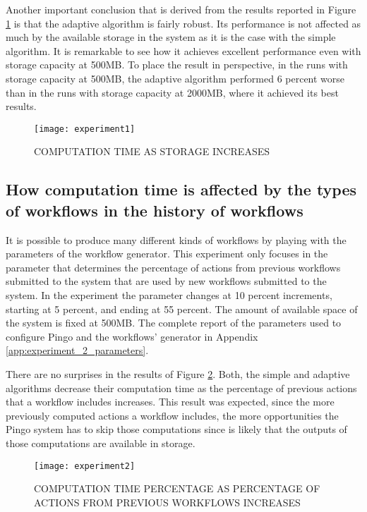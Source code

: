 Another important conclusion that is derived from the results reported in Figure \ref{fig:experiment1} is that the adaptive algorithm is fairly robust. Its performance is not affected as much by the available storage in the system as it is the case with the simple algorithm. It is remarkable to see how it achieves excellent performance even with storage capacity at 500MB.  To place the result in perspective, in the runs with storage capacity at 500MB, the adaptive algorithm performed 6 percent worse than in the runs with storage capacity at 2000MB, where it achieved its best results.


\begin{figure}
\centering
\texttt{[image: experiment1]}
\caption{COMPUTATION TIME AS STORAGE INCREASES}
\label{fig:experiment1}
\end{figure}

\subsection{How computation time is affected by the types of workflows in the history of workflows}
It is possible to produce many different kinds of workflows by playing with the parameters of the workflow generator.  This experiment only focuses in the parameter that determines the percentage of actions from previous workflows submitted to the system that are used by new workflows submitted to the system.  In the experiment the parameter changes at 10 percent increments, starting at 5 percent, and ending at 55 percent.  The amount of available space of the system is fixed at 500MB.   The complete report of the parameters used to configure Pingo and the workflows' generator in Appendix \ref{app:experiment_2_parameters}.

There are no surprises in the results of Figure \ref{fig:experiment2}.  Both, the simple and adaptive algorithms decrease their computation time as the percentage of previous actions that a workflow includes increases.  This result was expected, since the more previously computed actions a workflow includes, the more opportunities the Pingo system has to skip those computations since is likely that the outputs of those computations are available in storage.

\begin{figure}
\centering
\texttt{[image: experiment2]}
\caption{COMPUTATION TIME PERCENTAGE AS PERCENTAGE OF ACTIONS FROM PREVIOUS WORKFLOWS INCREASES}
\label{fig:experiment2}
\end{figure}

